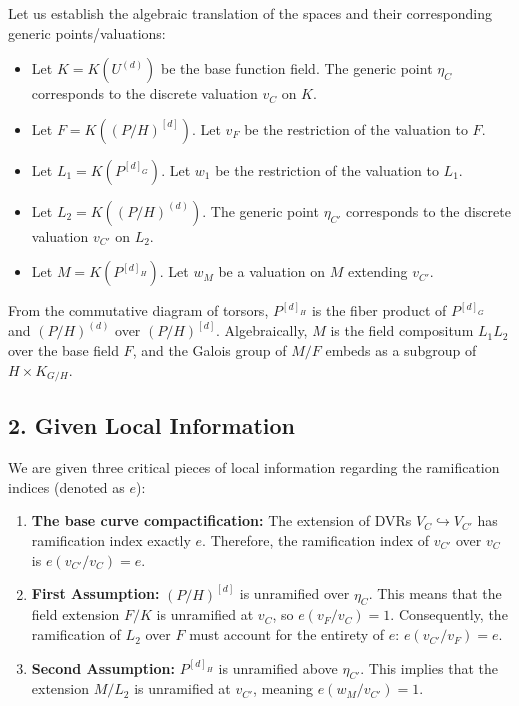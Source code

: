 Let us establish the algebraic translation of the spaces and their corresponding generic points/valuations:
\begin{itemize}
    \item Let $K = K(U^{(d)})$ be the base function field. The generic point $\eta_C$ corresponds to the discrete valuation $v_C$ on $K$.
    \item Let $F = K((P/H)^{[d]})$. Let $v_F$ be the restriction of the valuation to $F$.
    \item Let $L_1 = K(P^{[d]_G})$. Let $w_1$ be the restriction of the valuation to $L_1$.
    \item Let $L_2 = K((P/H)^{(d)})$. The generic point $\eta_{C'}$ corresponds to the discrete valuation $v_{C'}$ on $L_2$.
    \item Let $M = K(P^{[d]_H})$. Let $w_M$ be a valuation on $M$ extending $v_{C'}$.
\end{itemize}

From the commutative diagram of torsors, $P^{[d]_H}$ is the fiber product of $P^{[d]_G}$ and $(P/H)^{(d)}$ over $(P/H)^{[d]}$. Algebraically, $M$ is the field compositum $L_1 L_2$ over the base field $F$, and the Galois group of $M/F$ embeds as a subgroup of $H \times K_{G/H}$.

\vspace{1em}
\begin{center}
\end{center}
\vspace{1em}

\subsection*{2. Given Local Information}

We are given three critical pieces of local information regarding the ramification indices (denoted as $e$):

\begin{enumerate}
    \item \textbf{The base curve compactification:} The extension of DVRs $V_C \hookrightarrow V_{C'}$ has ramification index exactly $e$. Therefore, the ramification index of $v_{C'}$ over $v_C$ is $e(v_{C'} / v_C) = e$.
    \item \textbf{First Assumption:} $(P/H)^{[d]}$ is unramified over $\eta_C$. This means that the field extension $F/K$ is unramified at $v_C$, so $e(v_F / v_C) = 1$. Consequently, the ramification of $L_2$ over $F$ must account for the entirety of $e$: $e(v_{C'} / v_F) = e$.
    \item \textbf{Second Assumption:} $P^{[d]_H}$ is unramified above $\eta_{C'}$. This implies that the extension $M/L_2$ is unramified at $v_{C'}$, meaning $e(w_M / v_{C'}) = 1$.
\end{enumerate}

